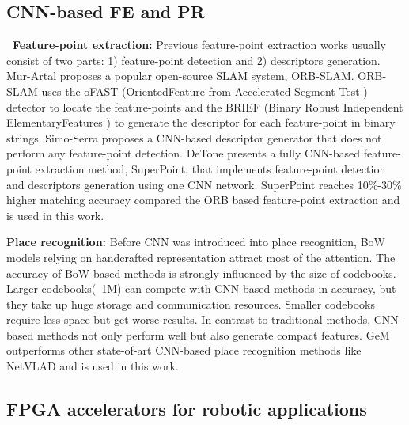 
\label{sec:relate}

\subsection{ CNN-based FE and PR }

\textbf{\quad \ Feature-point extraction:} Previous feature-point extraction works usually consist of two parts: 1) feature-point detection and 2) descriptors generation.
Mur-Artal \cite{Mur-Artal:2017281} proposes a popular open-source SLAM system, ORB-SLAM. ORB-SLAM uses the oFAST (OrientedFeature from Accelerated Segment Test \cite{biadgie2014feature}) detector to locate the feature-points and the BRIEF (Binary Robust Independent ElementaryFeatures \cite{calonder2010brief}) to generate the descriptor for each feature-point in binary strings. 
Simo-Serra \cite{simo2015discriminative} proposes a CNN-based descriptor generator that does not perform any feature-point detection. 
DeTone \cite{detone2018superpoint} presents a fully CNN-based feature-point extraction method, SuperPoint, that implements feature-point detection and descriptors generation using one CNN network. SuperPoint\cite{detone2018superpoint} reaches 10\%-30\% higher matching accuracy compared the ORB based feature-point extraction \cite{Mur-Artal:2017281} and is used in this work.

\textbf{Place recognition:} Before CNN was introduced into place recognition, BoW \cite{small_1} models relying on handcrafted representation attract most of the attention. The accuracy of BoW-based methods is strongly influenced by the size of codebooks. Larger codebooks(~1M) \cite{large_1, large_2} can compete with CNN-based methods in accuracy, but they take up huge storage and communication resources. Smaller codebooks\cite{small_1, small_2} require less space but get worse results. In contrast to traditional methods, CNN-based methods not only perform well but also generate compact features. GeM \cite{radenovic2018fine} outperforms other state-of-art CNN-based place recognition methods like NetVLAD \cite{arandjelovic2016netvlad} and is used in this work.


\subsection{ FPGA accelerators for robotic applications }

